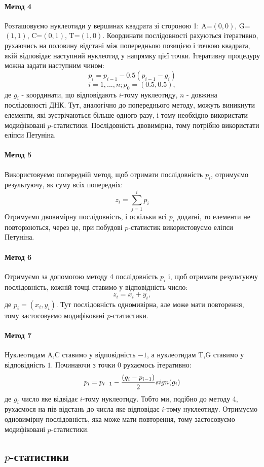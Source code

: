\documentclass[14pt,a4paper,titlepage]{extarticle}
\begin{document}
\paragraph{Метод 4}
Розташовуємо нуклеотиди у вершинах квадрата зі стороною 1: A=$(0,0)$,
G=$(1,1)$, C=$(0,1)$, T=$(1,0)$. Координати послідовності рахуються ітеративно,
рухаючись на половину відстані між попередньою позицією і точкою квадрата, якій
відповідає наступний нуклеотид у напрямку цієї точки. Ітеративну процедуру
можна задати наступним чином:
\[p_i = p_{i-1}-0.5(p_{i-1}-g_i)\]
\[i=1,...,n; p_0=(0.5,0.5),\]
де $g_i$ - координати, що відповідають $i$-тому нуклеотиду, $n$ - довжина послідовності ДНК. Тут, аналогічно до попереднього методу, можуть виникнути елементи,
які зустрічаються більше одного разу, і тому необхідно використати модифіковані $p$-статистики. Послідовність двовимірна, тому потрібно використати еліпси
Петуніна.
\paragraph{Метод 5}
Використовуємо попередній метод, щоб отримати послідовність $p_i$, отримуємо результуючу, як суму всіх попередніх:
\[z_i = \sum_{j=1}^{i} p_i\]
Отримуємо двовимірну послідовність, і оскільки всі $p_i$ додатні, то елементи не
повторюються, через це, при побудові $p$-статистик використовуємо еліпси Петуніна.
\paragraph{Метод 6}
Отримуємо за допомогою методу 4 послідовність $p_i$ і, щоб отримати результуючу послідовність, кожній точці ставимо у відповідність число:
\[z_i = x_i + y_i,\]
де $p_i = (x_i,y_i)$.
Тут послідовність одномивірна, але може мати повторення, тому застосовуємо
модифіковані $p$-статистики.
\paragraph{Метод 7}
Нуклеотидам A,C ставимо у відповідність $-1$, а нуклеотидам T,G ставимо у відповідність $1$. Починаючи з точки $0$ рухаємось ітеративно:
\[p_i = p_{i-1} - {(g_i-p_{i-1}) \over{2}}sign(g_i)\]
де $g_i$ число яке відвідає $i$-тому нуклеотиду. Тобто ми, подібно до методу 4, рухаємося на пів відстань до числа яке відповідає $i$-тому нуклеотиду.
Отримуємо одновимірну послідовність, яка може мати повторення, тому застосовуємо
модифіковані $p$-статистики.

\subsection{$p$-статистики}
\end{document}
